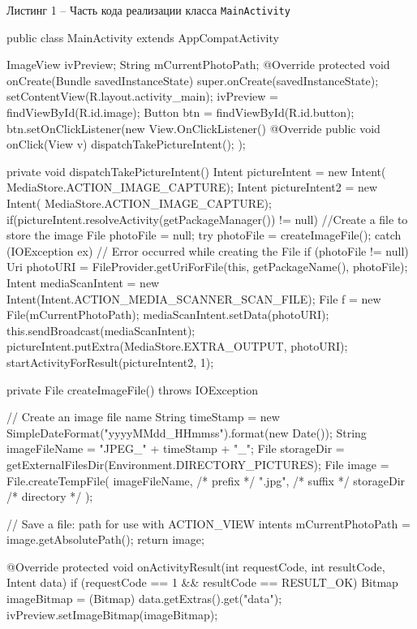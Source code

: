 \documentclass[a4paper,12pt]{article}
\begin{document}
\begin{center}
Листинг 1 -- Часть кода реализации класса \verb|MainActivity|
\end{center}


\begin{MyCode}

public class MainActivity extends AppCompatActivity {	
	ImageView ivPreview;
	String mCurrentPhotoPath;
	@Override
	protected void onCreate(Bundle savedInstanceState) {
		super.onCreate(savedInstanceState);
		setContentView(R.layout.activity_main);
		ivPreview = findViewById(R.id.image);
		Button btn = findViewById(R.id.button);
		btn.setOnClickListener(new View.OnClickListener() {
			@Override
			public void onClick(View v) {
				dispatchTakePictureIntent();
			}
		});
	}
	
	private void dispatchTakePictureIntent() {
		Intent pictureIntent = new Intent(
		MediaStore.ACTION_IMAGE_CAPTURE);
		Intent pictureIntent2 = new Intent(
		MediaStore.ACTION_IMAGE_CAPTURE);
		if(pictureIntent.resolveActivity(getPackageManager()) != null){
			//Create a file to store the image
			File photoFile = null;
			try {
				photoFile = createImageFile();
			} catch (IOException ex) {
				// Error occurred while creating the File		
			}
			if (photoFile != null) {
				Uri photoURI = FileProvider.getUriForFile(this, getPackageName(), photoFile);
				Intent mediaScanIntent = new Intent(Intent.ACTION_MEDIA_SCANNER_SCAN_FILE);
				File f = new File(mCurrentPhotoPath);
				mediaScanIntent.setData(photoURI);
				this.sendBroadcast(mediaScanIntent);
				pictureIntent.putExtra(MediaStore.EXTRA_OUTPUT,
				photoURI);
				startActivityForResult(pictureIntent2,
				1);
			}
		}
	}
	
	private File createImageFile() throws IOException {
		// Create an image file name
		String timeStamp = new SimpleDateFormat("yyyyMMdd_HHmmss").format(new Date());
		String imageFileName = "JPEG_" + timeStamp + "_";
		File storageDir = getExternalFilesDir(Environment.DIRECTORY_PICTURES);
		File image = File.createTempFile(
		imageFileName,  /* prefix */
		".jpg",         /* suffix */
		storageDir      /* directory */
		);
		
		// Save a file: path for use with ACTION_VIEW intents
		mCurrentPhotoPath = image.getAbsolutePath();
		return image;
	}
	
	@Override
	protected void onActivityResult(int requestCode, int resultCode, Intent data) {
		if (requestCode == 1 && resultCode == RESULT_OK) {
			Bitmap imageBitmap = (Bitmap) data.getExtras().get("data");
			ivPreview.setImageBitmap(imageBitmap);
		}
	}
}
\end{MyCode}
\end{document}
